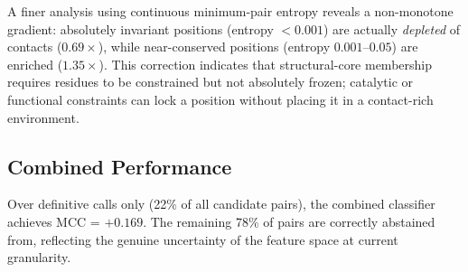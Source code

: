 A finer analysis using continuous minimum-pair entropy reveals a non-monotone
gradient: absolutely invariant positions (entropy $< 0.001$) are actually
\emph{depleted} of contacts ($0.69\times$), while near-conserved positions
(entropy $0.001$--$0.05$) are enriched ($1.35\times$).  This correction
indicates that structural-core membership requires residues to be constrained
but not absolutely frozen; catalytic or functional constraints can lock a
position without placing it in a contact-rich environment.

\subsection{Combined Performance}
Over definitive calls only (22\% of all candidate pairs), the combined
classifier achieves MCC = $+0.169$.  The remaining 78\% of pairs are correctly
abstained from, reflecting the genuine uncertainty of the feature space at
current granularity.
